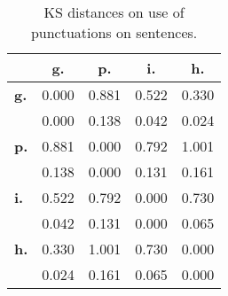 \begin{table}[h!]
\begin{center}
\begin{tabular}{| l || c | c | c | c |}\hline
 & {\bf g.} & {\bf p.} & {\bf i.} & {\bf h.} \\\hline\hline
{\bf g.} & 0.000 & 0.881 & 0.522 & 0.330 \\
{\bf } & 0.000 & 0.138 & 0.042 & 0.024 \\\hline
{\bf p.} & 0.881 & 0.000 & 0.792 & 1.001 \\
{\bf } & 0.138 & 0.000 & 0.131 & 0.161 \\\hline
{\bf i.} & 0.522 & 0.792 & 0.000 & 0.730 \\
{\bf } & 0.042 & 0.131 & 0.000 & 0.065 \\\hline
{\bf h.} & 0.330 & 1.001 & 0.730 & 0.000 \\
{\bf } & 0.024 & 0.161 & 0.065 & 0.000 \\\hline
\end{tabular}
\caption{KS distances on use of punctuations on sentences.}
\end{center}
\end{table}